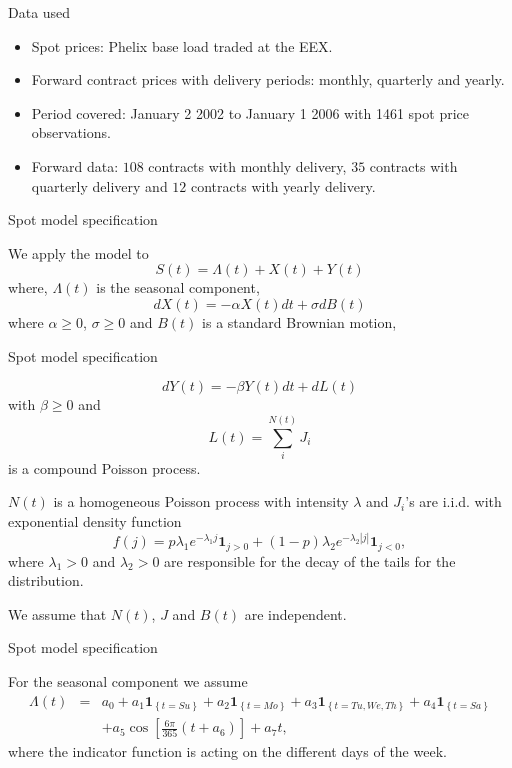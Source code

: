 {Data used}
\begin{itemize}
\item Spot prices: Phelix base load traded at the EEX.
\item Forward contract prices with delivery periods: monthly, quarterly and yearly.
\item Period covered: January 2 2002 to January 1 2006 with 1461 spot price
observations.
\item Forward data: $108$ contracts with
monthly delivery, $35$ contracts with quarterly delivery and $12$
contracts with yearly delivery.
\end{itemize}


{Spot model specification}

We apply the model to
\[S(t)=\Lambda(t)+X(t)+Y(t)\]
where, $\Lambda(t)$ is the seasonal component,
\begin{equation}
dX(t)=-\alpha X(t)dt+\sigma dB(t)
\end{equation}
where $\alpha\geq 0$,  $\sigma \geq 0$ and $B(t)$ is a
standard Brownian motion,



{Spot model specification}

\begin{equation}
dY(t)=-\beta Y(t)dt+dL(t)
\end{equation}
with $\beta \geq 0$ and
\begin{equation}
L(t)=\sum^{N(t)}_iJ_i
\end{equation}
is a compound Poisson process.

$N(t)$ is a homogeneous Poisson
process with intensity $\lambda$ and $J_i$'s are i.i.d. with
exponential density function
\[f(j)=p\lambda_1e^{-\lambda_1j}\textbf{1}_{j>0}+(1-p)\lambda_2e^{-\lambda_2|j|}\textbf{1}_{j<0},\]
where $\lambda_1>0$ and $\lambda_2>0$ are responsible for the
decay of the tails for the distribution.

We assume that $N(t)$, $J$ and $B(t)$ are independent.



{Spot model specification}

For the seasonal component we assume
\begin{eqnarray*}
\Lambda(t) & = & a_0+a_1\textbf{1}_{\left\{t=Su\right\}}+a_2\textbf{1}_{\left\{t=Mo\right\}}+a_3\textbf{1}_{\left\{t=Tu,We,Th\right\}}+a_4\textbf{1}_{\left\{t=Sa\right\}} \\
& & +a_5\cos\left[\frac{6\pi}{365}\left(t+a_6\right)\right]+a_7t,
\end{eqnarray*}
where the indicator function is acting on the different days of the
week.





